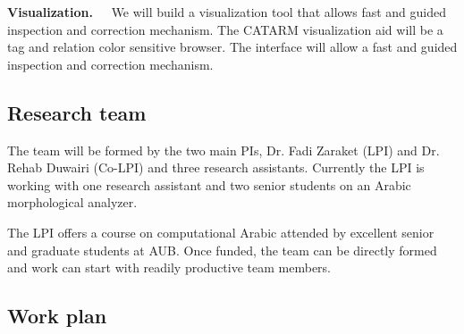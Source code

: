 \documentclass[12pt]{article}
\begin{document}
{\bf Visualization.~~}
We will build a visualization tool that allows fast 
and guided inspection and correction mechanism. 
The CATARM visualization aid will be a tag and relation color
sensitive browser.
The interface will allow a fast and guided inspection and 
correction mechanism.

\subsection{Research team}

The team will be formed by the two main PIs, Dr. Fadi Zaraket (LPI)
and Dr. Rehab Duwairi (Co-LPI) and three research assistants.
Currently the LPI is working with one research assistant 
and two senior students on an Arabic morphological analyzer. 

The LPI offers a course on computational Arabic attended
by excellent senior and graduate students at AUB. 
Once funded, the team can be directly formed and work can start
with readily productive team members. 

\subsection{Work plan}
\label{s:design:plan}
\end{document}
